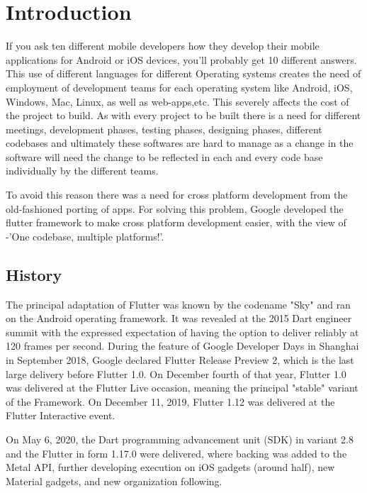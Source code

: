 \chapter{Introduction}

If you ask ten different mobile developers how they develop their mobile applications for Android or iOS devices, you’ll probably get 10 different answers. This use of different languages for different Operating systems creates the need of employment of development teams for each operating system like Android, iOS, Windows, Mac, Linux, as well as web-apps,etc. This severely affects the cost of the project to build. As with every project to be built there is a need for different meetings, development phases, testing phases, designing phases, different codebases and ultimately these softwares are hard to manage as a change in the software will need the change to be reflected in each and every code base individually by the different teams.

To avoid this reason there was a need for cross platform development from
the old-fashioned porting of apps. For solving this problem, Google developed the
flutter framework to make cross platform development easier, with the view of
-’One codebase, multiple platforms!’. 



\section{History}

The principal adaptation of Flutter was known by the codename "Sky" and ran on the Android operating framework. It was revealed at the 2015 Dart engineer summit with the expressed expectation of having the option to deliver reliably at 120 frames per second. During the feature of Google Developer Days in Shanghai in September 2018, Google declared Flutter Release Preview 2, which is the last large delivery before Flutter 1.0. On December fourth of that year, Flutter 1.0 was delivered at the Flutter Live occasion, meaning the principal "stable" variant of the Framework. On December 11, 2019, Flutter 1.12 was delivered at the Flutter Interactive event.

On May 6, 2020, the Dart programming advancement unit (SDK) in variant 2.8 and the Flutter in form 1.17.0 were delivered, where backing was added to the Metal API, further developing execution on iOS gadgets (around half), new Material gadgets, and new organization following.

